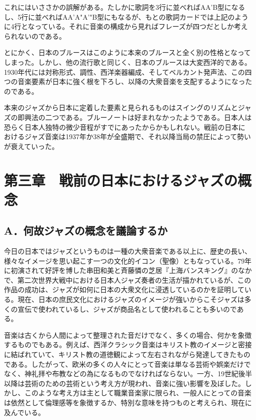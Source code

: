 これにはいささかの誤解がある。たしかに歌詞を3行に並べればAA'B型になるし、5行に並べればAA'A"A'"B型にもなるが、もとの歌詞カードでは上記のように4行となっている。それに音楽の構成から見ればフレーズが四つだとしか考えられないのである。

とにかく、日本のブルースはこのように本来のブルースと全く別の性格となってしまった。しかし、他の流行歌と同じく、日本のブルースは大変西洋的である。1930年代には対称形式、調性、西洋楽器編成、そしてベルカント発声法、この四つの音楽要素が日本に強く根を下ろし、以降の大衆音楽を支配するようになったのである。

本来のジャズから日本に定着した要素と見られるものはスイングのリズムとジャズの即興法の二つである。ブルーノートは好まれなかったようである。日本人は恐らく日本人独特の微少音程がすでにあったからかもしれない。戦前の日本におけるジャズ音楽は1937年か38年が全盛期で、それ以降当局の禁圧によって勢いが衰えていった。

\section{第三章　戦前の日本におけるジャズの概念}

\subsection{A．何故ジャズの概念を議論するか}

今日の日本ではジャズというものは一種の大衆音楽である以上に、歴史の長い、様々なイメージを思い起こす一つの文化的イコン（聖像）ともなっている。79年に初演されて好評を博した串田和美と斉藤憐の芝居『上海バンスキング』のなかで、第二次世界大戦中における日本人ジャズ奏者の生活が描かれているが、この作品の成功は、ジャズが如何に日本の大衆文化に浸透しているのかを証明している。現在、日本の庶民文化におけるジャズのイメージが強いからこそジャズは多くの宣伝で使われているし、ジャズが商品名として使われることも多いのである。

音楽は古くから人間によって整理された音だけでなく、多くの場合、何かを象徴するものでもある。例えば、西洋クラシック音楽はキリスト教のイメージと密接に結ばれていて、キリスト教の道徳観によって左右されながら発達してきたものである。したがって、欧米の多くの人々にとって音楽は単なる芸術や娯楽だけでなく、神礼拝や布教などの為になるものでなければならない。一方、19世紀後半以降は芸術のための芸術という考え方が現われ、音楽に強い影響を及ぼした。しかし、このような考え方は主として職業音楽家に限られ、一般人にとっての音楽は依然として倫理感等を象徴するか、特別な意味を持つものと考えられ、現在に及んでいる。

